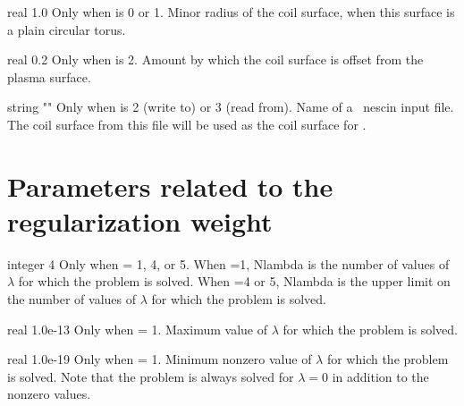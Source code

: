 \myhrule

{real}
{1.0}
{Only when  is 0 or 1.}
{Minor radius of the coil surface, when this surface is a plain circular torus.}


\myhrule

{real}
{0.2}
{Only when  is 2.}
{Amount by which the coil surface is offset from the plasma surface.}

\myhrule

{string}
{{\ttfamily ""}}
{Only when  is 2 (write to) or 3 (read from).}
{Name of a \nescoil~{\ttfamily nescin} input file. The coil surface from
this file will be used as the coil surface for \regcoil.}


\section{Parameters related to the regularization weight}

{integer}
{4}
{Only when  = 1, 4, or 5.}
{When =1, {\ttfamily Nlambda} is the number of values of $\lambda$ for which the problem is solved.
When =4 or 5, {\ttfamily Nlambda} is the upper limit on the number of values of $\lambda$ for which the problem is solved.}

\myhrule

{real}
{1.0e-13}
{Only when  = 1.}
{Maximum value of $\lambda$ for which the problem is solved.}

\myhrule

{real}
{1.0e-19}
{Only when  = 1.}
{Minimum nonzero value of $\lambda$ for which the problem is solved.
Note that the problem is always solved for $\lambda=0$ in addition to
the nonzero values.}

\myhrule

